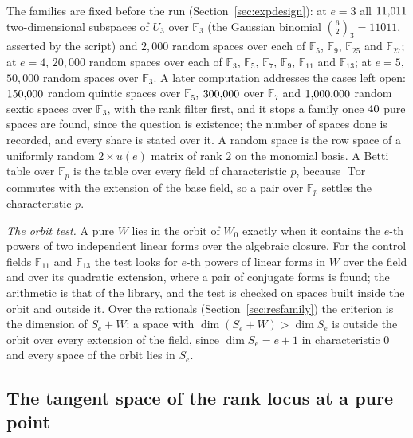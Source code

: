 \documentclass[11pt]{article}
\theoremstyle{definition}
\theoremstyle{remark}
\newcommand{\F}{\mathbb{F}}
\newcommand{\Tor}{\operatorname{Tor}}
\begin{document}
The families are fixed before the run (Section~\ref{sec:expdesign}): at $e=3$ all $11{,}011$ two-dimensional subspaces of $U_3$ over $\F_3$ (the Gaussian binomial $\binom62_3=11011$, asserted by the script) and $2{,}000$ random spaces over each of $\F_5$, $\F_9$, $\F_{25}$ and $\F_{27}$; at $e=4$, $20{,}000$ random spaces over each of $\F_3$, $\F_5$, $\F_7$, $\F_9$, $\F_{11}$ and $\F_{13}$; at $e=5$, $50{,}000$ random spaces over $\F_3$. A later computation addresses the cases left open: $150{,}000$ random quintic spaces over $\F_5$, $300{,}000$ over $\F_7$ and $1{,}000{,}000$ random sextic spaces over $\F_3$, with the rank filter first, and it stops a family once $40$ pure spaces are found, since the question is existence; the number of spaces done is recorded, and every share is stated over it. A random space is the row space of a uniformly random $2\times u(e)$ matrix of rank $2$ on the monomial basis. A Betti table over $\F_p$ is the table over every field of characteristic $p$, because $\Tor$ commutes with the extension of the base field, so a pair over $\F_p$ settles the characteristic $p$.

\emph{The orbit test.} A pure $W$ lies in the orbit of $W_0$ exactly when it contains the $e$-th powers of two independent linear forms over the algebraic closure. For the control fields $\F_{11}$ and $\F_{13}$ the test looks for $e$-th powers of linear forms in $W$ over the field and over its quadratic extension, where a pair of conjugate forms is found; the arithmetic is that of the library, and the test is checked on spaces built inside the orbit and outside it. Over the rationals (Section~\ref{sec:resfamily}) the criterion is the dimension of $S_e+W$: a space with $\dim(S_e+W)>\dim S_e$ is outside the orbit over every extension of the field, since $\dim S_e=e+1$ in characteristic $0$ and every space of the orbit lies in $S_e$.

\subsection{The tangent space of the rank locus at a pure point}
\label{sec:tangentmethods}
\end{document}
